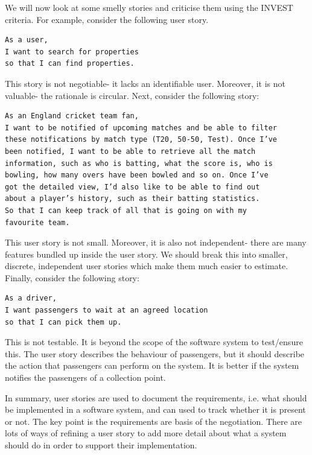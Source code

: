 \documentclass[a4paper, openany]{memoir}
\begin{document}
We will now look at some smelly stories and criticise them using the INVEST criteria. For example, consider the following user story.
\begin{verbatim}
As a user,
I want to search for properties
so that I can find properties.
\end{verbatim}
This story is not negotiable- it lacks an identifiable user. Moreover, it is not valuable- the rationale is circular. Next, consider the following story:
\begin{verbatim}
As an England cricket team fan,
I want to be notified of upcoming matches and be able to filter 
these notifications by match type (T20, 50-50, Test). Once I’ve 
been notified, I want to be able to retrieve all the match 
information, such as who is batting, what the score is, who is
bowling, how many overs have been bowled and so on. Once I’ve 
got the detailed view, I’d also like to be able to find out
about a player’s history, such as their batting statistics.
So that I can keep track of all that is going on with my 
favourite team.
\end{verbatim}
This user story is not small. Moreover, it is also not independent- there are many features bundled up inside the user story. We should break this into smaller, discrete, independent user stories which make them much easier to estimate. Finally, consider the following story:
\begin{verbatim}
As a driver,
I want passengers to wait at an agreed location
so that I can pick them up.
\end{verbatim}
This is not testable. It is beyond the scope of the software system to test/ensure this. The user story describes the behaviour of passengers, but it should describe the action that passengers can perform on the system. It is better if the system notifies the passengers of a collection point.

In summary, user stories are used to document the requirements, i.e. what should be implemented in a software system, and can used to track whether it is present or not. The key point is the requirements are basis of the negotiation. There are lots of ways of refining a user story to add more detail about what a system should do in order to support their implementation.
\end{document}
